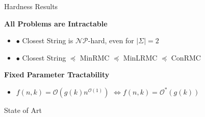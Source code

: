 \documentclass{beamer}
\renewcommand{\l}{\left}
\renewcommand{\r}{\right}
\begin{document}
\begin{frame}{Hardness Results}

  \begin{center}
    \textbf{All Problems are Intractable}
  \end{center}

  \begin{itemize}
  \item $\bullet$ Closest String is $\mathcal{NP}$-hard, even for
    $|\Sigma| = 2$
  \item $\bullet$ Closest String $\preceq$ MinRMC $\preceq$ MinLRMC
    $\preceq$ ConRMC
  \end{itemize}
\pause
  \begin{center}
    \textbf{Fixed Parameter Tractability}
  \end{center}
  
  \begin{itemize}
  \item $f(n, k) = \mathcal{O}\l(g(k) n^{\mathcal{O}(1)}\r)$ \pause
    $ \iff f(n, k) = \mathcal{O}^* \l(g(k)\r)$
  \end{itemize}
\end{frame}

\begin{frame}{State of Art}
  
  
\end{frame}
\end{document}
